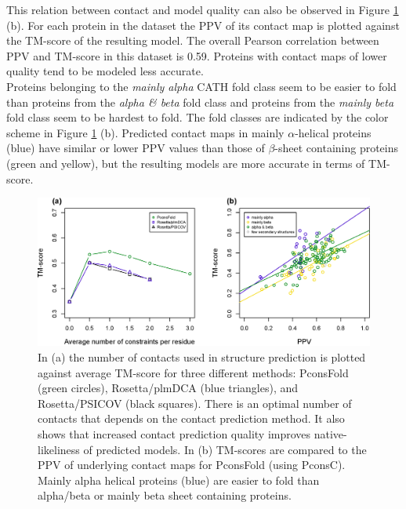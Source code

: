 \documentclass{bioinfo}
\begin{document}
This relation between contact and model quality can also be observed
in Figure \ref{fig:main} (b). For each protein in the dataset the PPV
of its contact map is plotted against the TM-score of the resulting
model. The overall Pearson correlation between PPV and TM-score in
this dataset is 0.59. Proteins with contact maps of lower quality tend
to be modeled less accurate. \\\indent Proteins belonging to the {\it
  mainly alpha} CATH fold class seem to be easier to fold than
proteins from the {\it alpha \& beta} fold class and proteins from the
{\it mainly beta} fold class seem to be hardest to fold. The fold
classes are indicated by the color scheme in Figure \ref{fig:main}
(b). Predicted contact maps in mainly $\alpha$-helical proteins (blue)
have similar or lower PPV values than those of $\beta$-sheet
containing proteins (green and yellow), but the resulting models are
more accurate in terms of TM-score.

\begin{figure}[!tpb]%
\centerline{\includegraphics[scale=0.7]{figures/tmscores.eps}}
\caption{In (a) the number of contacts used in structure prediction is plotted against average TM-score for three different methods: PconsFold (green circles), Rosetta/plmDCA (blue triangles), and Rosetta/PSICOV (black squares). There is an optimal number of contacts that depends on the contact prediction method. It also shows that increased contact prediction quality improves native-likeliness of predicted models. In (b) TM-scores are compared to the PPV of underlying contact maps for PconsFold (using PconsC). Mainly alpha helical proteins (blue) are easier to fold than alpha/beta or mainly beta sheet containing proteins.}\label{fig:main}
\end{figure}
\end{document}
